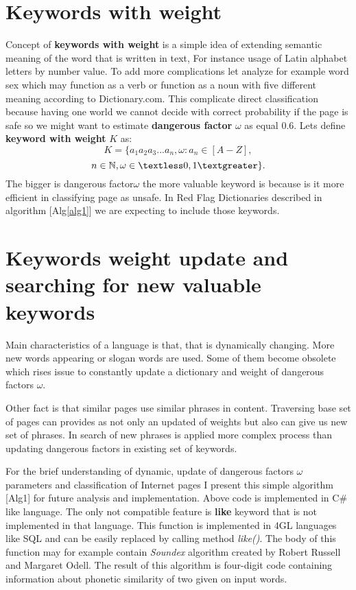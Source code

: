 \documentclass[9pt,a4paper]{extarticle}
\begin{document}
\begin{multicols}{2}
\section{Keywords with weight}
Concept of \textbf{keywords with weight} is a simple idea of extending semantic meaning of the word that is written in text, For instance usage of Latin alphabet letters by number value. To add more complications let analyze for example word sex which may function as a verb or function as a noun with five different meaning according to Dictionary.com\cite{noauthor_dictionary.com_2018}. This complicate direct classification because having one world we cannot decide with correct probability if the page is safe so we might want to estimate \textbf{dangerous factor} \(\omega\) as equal 0.6. Lets define \textbf{keyword with weight} \(K\) as:
$$
K = \{a_1a_2a_3...a_n, \omega : a_n \in [A-Z], 
$$
$$
n \in \mathbb{N}, \omega \in \textless0,1\textgreater\}.
$$
The bigger is dangerous factor\(\omega\) the more valuable keyword is because is it more efficient in classifying page as unsafe. In Red Flag Dictionaries described in algorithm [Alg\ref{alg1}] we are expecting to include those keywords.

\section{Keywords weight update and searching for new valuable keywords}
Main characteristics of a language is that, that  is dynamically changing. More  new words appearing or slogan words are used. Some of them  become obsolete which rises issue to constantly update a dictionary and weight of dangerous factors \(\omega\).

Other fact is that similar pages use similar phrases in content. Traversing base set of pages can provides as not only an updated of weights but also can give us new set of phrases. In search of new phrases is applied more complex process than updating dangerous factors in existing set of keywords.

For the brief understanding of dynamic, update of dangerous factors \(\omega\) parameters and classification of Internet pages I present this simple algorithm [Alg1] for future analysis and implementation. Above code is implemented in C\#\cite{andrew_troelsen_jezyk_2011} like language. The only not compatible feature is \textbf{like} keyword that is not implemented in that language. This function is implemented in 4GL languages like SQL and can be easily replaced by calling method \textit{like()}. The body of this function may for example contain \textit{Soundex} algorithm created by Robert Russell and Margaret Odell\cite{donald_e._knuth_art_2002}. The result of this algorithm is four-digit code containing information about phonetic similarity of two given on input words.


\end{multicols}
\end{document}
